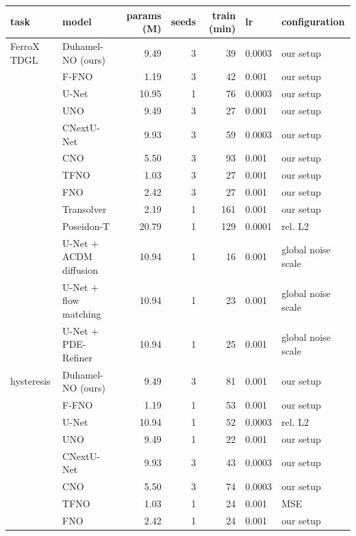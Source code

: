 \begin{tabular}{llrrrll}
\toprule
task & model & params (M) & seeds & train (min) & lr & configuration \\
\midrule
FerroX TDGL & Duhamel-NO (ours) & 9.49 & 3 & 39 & 0.0003 & our setup \\
 & F-FNO & 1.19 & 3 & 42 & 0.001 & our setup \\
 & U-Net & 10.95 & 1 & 76 & 0.0003 & our setup \\
 & UNO & 9.49 & 3 & 27 & 0.001 & our setup \\
 & CNextU-Net & 9.93 & 3 & 59 & 0.0003 & our setup \\
 & CNO & 5.50 & 3 & 93 & 0.001 & our setup \\
 & TFNO & 1.03 & 3 & 27 & 0.001 & our setup \\
 & FNO & 2.42 & 3 & 27 & 0.001 & our setup \\
 & Transolver & 2.19 & 1 & 161 & 0.001 & our setup \\
 & Poseidon-T & 20.79 & 1 & 129 & 0.0001 & rel. L2 \\
 & U-Net + ACDM diffusion & 10.94 & 1 & 16 & 0.001 & global noise scale \\
 & U-Net + flow matching & 10.94 & 1 & 23 & 0.001 & global noise scale \\
 & U-Net + PDE-Refiner & 10.94 & 1 & 25 & 0.001 & global noise scale \\
\midrule
hysteresis & Duhamel-NO (ours) & 9.49 & 3 & 81 & 0.001 & our setup \\
 & F-FNO & 1.19 & 1 & 53 & 0.001 & our setup \\
 & U-Net & 10.94 & 1 & 52 & 0.0003 & rel. L2 \\
 & UNO & 9.49 & 1 & 22 & 0.001 & our setup \\
 & CNextU-Net & 9.93 & 3 & 43 & 0.0003 & our setup \\
 & CNO & 5.50 & 3 & 74 & 0.0003 & our setup \\
 & TFNO & 1.03 & 1 & 24 & 0.001 & MSE \\
 & FNO & 2.42 & 1 & 24 & 0.001 & our setup \\
\bottomrule
\end{tabular}